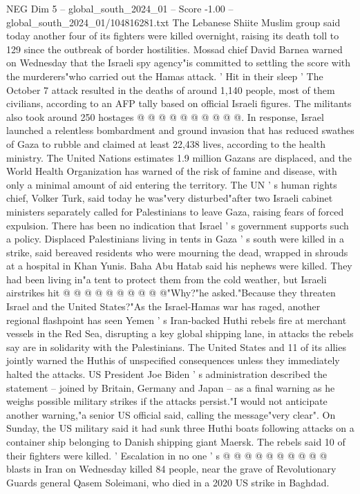 \begin{textsample}{NEG Dim 5 – global\_south\_2024\_01 – Score -1.00 – global\_south\_2024\_01/104816281.txt}
The Lebanese Shiite Muslim group said today another four of its fighters were killed overnight, raising its death toll to 129 since the outbreak of border hostilities.
Mossad chief David Barnea warned on Wednesday that the Israeli spy agency"is committed to settling the score with the murderers"who carried out the Hamas attack. ' Hit in their sleep ' The October 7 attack resulted in the deaths of around 1,140 people, most of them civilians, according to an AFP tally based on official Israeli figures.
The militants also took around 250 hostages @ @ @ @ @ @ @ @ @ @.
In response, Israel launched a relentless bombardment and ground invasion that has reduced swathes of Gaza to rubble and claimed at least 22,438 lives, according to the health ministry.
The United Nations estimates 1.9 million Gazans are displaced, and the World Health Organization has warned of the risk of famine and disease, with only a minimal amount of aid entering the territory.
The UN ' s human rights chief, Volker Turk, said today he was"very disturbed"after two Israeli cabinet ministers separately called for Palestinians to leave Gaza, raising fears of forced expulsion.
There has been no indication that Israel ' s government supports such a policy.
Displaced Palestinians living in tents in Gaza ' s south were killed in a strike, said bereaved residents who were mourning the dead, wrapped in shrouds at a hospital in Khan Yunis.
Baha Abu Hatab said his nephews were killed.
They had been living in"a tent to protect them from the cold weather, but Israeli airstrikes hit @ @ @ @ @ @ @ @ @ @"Why?"he asked."Because they threaten Israel and the United States?"As the Israel-Hamas war has raged, another regional flashpoint has seen Yemen ' s Iran-backed Huthi rebels fire at merchant vessels in the Red Sea, disrupting a key global shipping lane, in attacks the rebels say are in solidarity with the Palestinians.
The United States and 11 of its allies jointly warned the Huthis of unspecified consequences unless they immediately halted the attacks.
US President Joe Biden ' s administration described the statement -- joined by Britain, Germany and Japan -- as a final warning as he weighs possible military strikes if the attacks persist."I would not anticipate another warning,"a senior US official said, calling the message"very clear".
On Sunday, the US military said it had sunk three Huthi boats following attacks on a container ship belonging to Danish shipping giant Maersk.
The rebels said 10 of their fighters were killed. ' Escalation in no one ' s @ @ @ @ @ @ @ @ @ @ blasts in Iran on Wednesday killed 84 people, near the grave of Revolutionary Guards general Qasem Soleimani, who died in a 2020 US strike in Baghdad.

\end{textsample}
